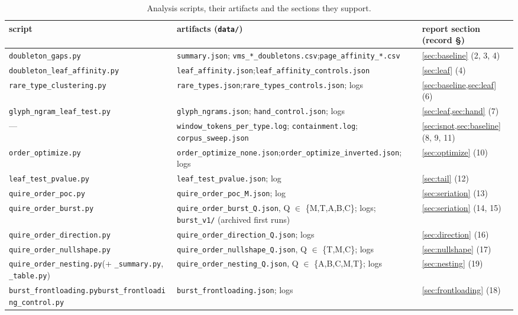 \documentclass[11pt,a4paper]{article}
\begin{document}
\begin{table}[H]
\centering\small
\caption{Analysis scripts, their artifacts and the sections they support.}
\label{tab:scripts}
\footnotesize\setlength{\tabcolsep}{4pt}
\begin{tabular}{@{}L{5.5cm}L{6.8cm}L{3.4cm}@{}}
\toprule
script & artifacts (\texttt{data/}) & report section (record \S)\\
\midrule
\texttt{doubleton\_gaps.py} & \texttt{summary.json}; \texttt{vms\_*\_doubletons.csv};\newline\texttt{page\_affinity\_*.csv} & \cref{sec:baseline} (2, 3, 4)\\
\texttt{doubleton\_leaf\_affinity.py} & \texttt{leaf\_affinity.json};\newline\texttt{leaf\_affinity\_controls.json} & \cref{sec:leaf} (4)\\
\texttt{rare\_type\_clustering.py} & \texttt{rare\_types.json};\newline\texttt{rare\_types\_controls.json}; logs & \cref{sec:baseline,sec:leaf} (6)\\
\texttt{glyph\_ngram\_leaf\_test.py} & \texttt{glyph\_ngrams.json}; \texttt{hand\_control.json}; logs & \cref{sec:leaf,sec:hand} (7)\\
--- & \texttt{window\_tokens\_per\_type.log}; \texttt{containment.log}; \texttt{corpus\_sweep.json} & \cref{sec:isnot,sec:baseline} (8, 9, 11)\\
\texttt{order\_optimize.py} & \texttt{order\_optimize\_none.json};\newline\texttt{order\_optimize\_inverted.json}; logs & \cref{sec:optimize} (10)\\
\texttt{leaf\_test\_pvalue.py} & \texttt{leaf\_test\_pvalue.json}; log & \cref{sec:tail} (12)\\
\texttt{quire\_order\_poc.py} & \texttt{quire\_order\_poc\_M.json}; log & \cref{sec:seriation} (13)\\
\texttt{quire\_order\_burst.py} & \texttt{quire\_order\_burst\_Q.json}, Q $\in$ \{M,T,A,B,C\}; logs; \texttt{burst\_v1/} (archived first runs) & \cref{sec:seriation} (14, 15)\\
\texttt{quire\_order\_direction.py} & \texttt{quire\_order\_direction\_Q.json}; logs & \cref{sec:direction} (16)\\
\texttt{quire\_order\_nullshape.py} & \texttt{quire\_order\_nullshape\_Q.json}, Q $\in$ \{T,M,C\}; logs & \cref{sec:nullshape} (17)\\
\texttt{quire\_order\_nesting.py}\newline(+ \texttt{\_summary.py}, \texttt{\_table.py}) & \texttt{quire\_order\_nesting\_Q.json}, Q $\in$ \{A,B,C,M,T\}; logs & \cref{sec:nesting} (19)\\
\texttt{burst\_frontloading.py}\newline\texttt{burst\_frontloading\_control.py} & \texttt{burst\_frontloading.json}; logs & \cref{sec:frontloading} (18)\\
\bottomrule
\end{tabular}
\end{table}
\end{document}

